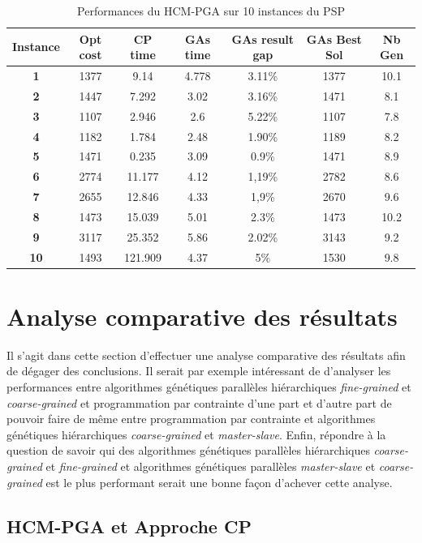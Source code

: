 \documentclass[12pt,a4paper]{article}
\begin{document}
		\begin{table}[h]
		\centering
		\begin{tabular}{|c|c|c|c|c|c|c|}
			\hline
			\textbf{Instance} & \textbf{Opt cost} & \textbf{CP time} & \textbf{GAs time} & \textbf{GAs result gap} & \textbf{GAs Best Sol} & \textbf{Nb Gen}\\
			\hline
			\textbf{1} & 1377 & 9.14 & 4.778 & 3.11\% & 1377 & 10.1 \\
			\textbf{2} & 1447 & 7.292 & 3.02 & 3.16\% & 1471 & 8.1\\
			\textbf{3} & 1107 & 2.946 & 2.6 & 5.22\% & 1107 & 7.8\\
			\textbf{4} & 1182 & 1.784 & 2.48 & 1.90\% & 1189 & 8.2\\
			\textbf{5} & 1471 & 0.235 & 3.09 & 0.9\% & 1471 & 8.9\\
			\textbf{6} & 2774 & 11.177 & 4.12 & 1,19\% & 2782 & 8.6\\
			\textbf{7} & 2655 & 12.846 & 4.33 & 1,9\% & 2670 & 9.6\\
			\textbf{8} & 1473 & 15.039 & 5.01 & 2.3\% & 1473 & 10.2\\
			\textbf{9} & 3117 & 25.352 & 5.86 & 2.02\% & 3143 & 9.2\\
			\textbf{10} & 1493 & 121.909 & 4.37 & 5\% & 1530 & 9.8\\
			\hline
		\end{tabular}	
		\caption{Performances du HCM-PGA sur 10 instances du PSP}	
	\end{table}			
	
		\section{Analyse comparative des résultats}
		Il s'agit dans cette section d'effectuer une analyse comparative des résultats afin de dégager des conclusions. Il serait par exemple intéressant de d'analyser les performances entre algorithmes génétiques parallèles hiérarchiques \emph{fine-grained} et \emph{coarse-grained} et programmation par contrainte d'une part et d'autre part de pouvoir faire de même entre programmation par contrainte et algorithmes génétiques hiérarchiques \emph{coarse-grained} et \emph{master-slave}. Enfin, répondre à la question de savoir qui des algorithmes génétiques parallèles hiérarchiques \emph{coarse-grained} et \emph{fine-grained} et algorithmes génétiques parallèles \emph{master-slave} et \emph{coarse-grained} est le plus performant serait une bonne façon d'achever cette analyse.
		\subsection{HCM-PGA et Approche CP}
		
\end{document}
